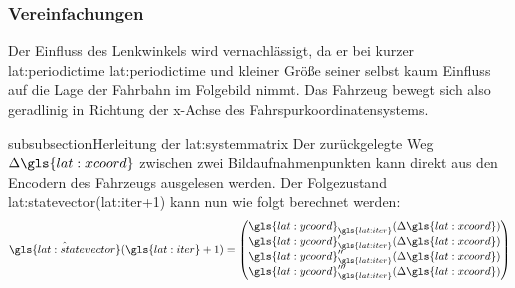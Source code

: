 \subsubsection{Vereinfachungen}
Der Einfluss des Lenkwinkels wird vernachlässigt, da er bei kurzer \glsdesc{lat:periodictime} \gls{lat:periodictime} und kleiner Größe seiner selbst kaum Einfluss auf die Lage der Fahrbahn im Folgebild nimmt. Das Fahrzeug bewegt sich also geradlinig in Richtung der x-Achse des Fahrspurkoordinatensystems. 

subsubsection{Herleitung der \glsdesc{lat:systemmatrix}}
Der zurückgelegte Weg \begin{math} \Delta \gls{lat:xcoord} \end{math} zwischen zwei Bildaufnahmenpunkten kann direkt aus den Encodern des Fahrzeugs ausgelesen werden. Der Folgezustand  \gls{lat:statevector}(\gls{lat:iter}+1) kann nun wie folgt berechnet werden:
\begin{equation}
\label{eq:nextstatemapping}
\hat{\gls{lat:statevector}}(\gls{lat:iter}+1) =
\begin{pmatrix}
\gls{lat:ycoord}_{\gls{lat:iter}}(\Delta \gls{lat:xcoord}) \\
\gls{lat:ycoord}_{\gls{lat:iter}}^\prime(\Delta \gls{lat:xcoord}) \\
\gls{lat:ycoord}_{\gls{lat:iter}}^{\prime\prime}(\Delta \gls{lat:xcoord}) \\
\gls{lat:ycoord}_{\gls{lat:iter}}^{\prime\prime\prime}(\Delta \gls{lat:xcoord}) \\
\end{pmatrix}
\end{equation}

